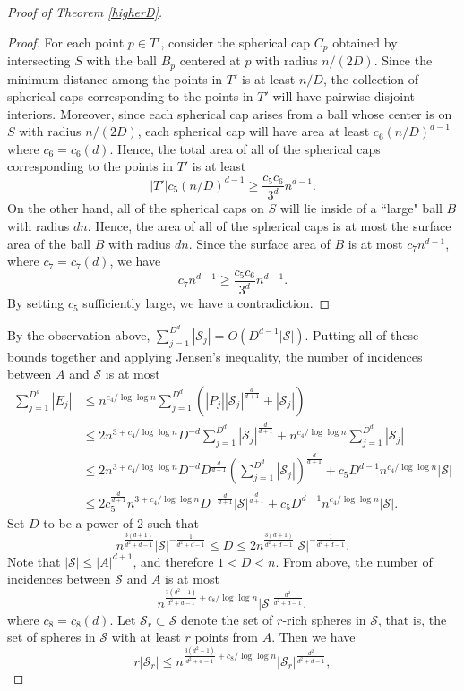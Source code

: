 \documentclass[11pt]{article}
\theoremstyle{plain}
\theoremstyle{definition}
\theoremstyle{remark}
\begin{document}
\begin{proof}[Proof of Theorem \ref{higherD}]
\begin{proof}
%
For each point $p \in T'$, consider the spherical cap $C_p$ obtained by intersecting $S$ with the ball $B_p$ centered at $p$ with radius $n/(2D)$.  Since the minimum distance among the points in $T'$ is at least $n/D$, the collection of spherical caps corresponding to the points in $T'$ will have pairwise disjoint interiors.  Moreover, since each spherical cap arises from a ball whose center is on $S$ with radius $n/(2D)$, each spherical cap will have area at least $c_6(n/D)^{d-1}$ where $c_6 = c_6(d)$.   Hence, the total area of all of the spherical caps corresponding to the points in $T'$ is at least
%
%
$$|T'|c_5(n/D)^{d-1} \geq \frac{c_5c_6}{3^d}n^{d-1}.$$
%
%
%
   \noindent On the other hand, all of the spherical caps on $S$ will lie inside of a ``large" ball $B$ with radius $dn$. Hence, the area of all of the spherical caps is at most the surface area of the ball $B$ with radius $dn$.   Since the surface area of $B$ is at most $c_7n^{d-1}$, where $c_7 = c_7(d)$, we have
%
   $$c_7n^{d-1} \geq \frac{c_5c_6}{3^d}n^{d-1}.$$
%
\noindent By setting $c_5$ sufficiently large, we have a contradiction.\end{proof}
%
%
By the observation above, $\sum_{j=1}^{D^d} |\mathcal{S}_j| = O(D^{d-1}|\mathcal{S}|)$. Putting all of these bounds together and applying Jensen's inequality, the number of incidences between $A$ and $\mathcal{S}$ is at most
%
    \begin{align*} \sum_{j=1}^{D^d} |E_j| &\leq n^{c_4/\log\log n}\sum_{j=1}^{D^d}  \left( |P_j||\mathcal{S}_j|^{\frac{d}{d+1}} + |\mathcal{S}_j| \right)\\
     &  \leq 2 n^{3 + c_4/\log\log n}D^{-d}\sum_{j=1}^{D^d}|\mathcal{S}_j|^{\frac{d}{d+1}} + n^{c_4/\log\log n}\sum_{j=1}^{D^d}|\mathcal{S}_j|  \\
    & \leq 2 n^{3 + c_4/\log\log n}D^{-d} D^{\frac{d}{d+1}}\left( \sum_{j=1}^{D^d} |\mathcal{S}_j| \right)^{\frac{d}{d+1}}  + c_5D^{d-1} n^{ c_4/\log\log n} |\mathcal{S}| \\
    & \leq 2 c_5^{\frac{d}{d+1}}n^{3 + c_4/\log\log n}D^{-\frac{d}{d+1}} |\mathcal{S}|^{\frac{d}{d+1}} + c_5D^{d-1} n^{ c_4/\log\log n} |\mathcal{S}|.
    \end{align*}
%
    Set $D$ to be a power of 2 such that
%
%
    $$   n^{\frac{3(d+1)}{d^2+d-1}} |\mathcal{S}|^{-\frac{1}{d^2+d-1}} \leq D \leq 2 n^{\frac{3(d+1)}{d^2+d-1}} |\mathcal{S}|^{-\frac{1}{d^2+d-1}}.$$ Note that $|\mathcal{S}| \leq |A|^{d+1}$, and therefore $1 < D < n$.  From above, the number of incidences between $\mathcal{S}$ and $A$ is at most$$n^{\frac{3(d^2-1)}{d^2+d-1}+c_8/\log\log n} |\mathcal{S}|^{\frac{d^2}{d^2+d-1}},$$ where $c_8 = c_8(d)$.  Let $\mathcal{S}_r\subset \mathcal{S}$ denote the set of $r$-rich spheres in $\mathcal{S}$, that is, the set of spheres in $\mathcal{S}$ with at least $r$ points from $A$. Then we have $$r|\mathcal{S}_r| \leq n^{\frac{3(d^2-1)}{d^2+d-1}+c_8/\log\log n} |\mathcal{S}_r|^{\frac{d^2}{d^2+d-1}},$$

\end{proof}
\end{document}
